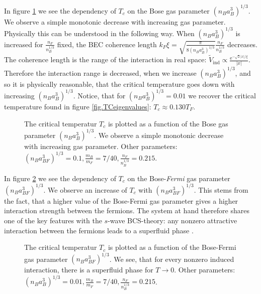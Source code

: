In figure \ref{fig.TCrB} we see the dependency of $T_c$ on the Bose gas parameter $(n_Ba_B^3)^{1/3}$. We observe a simple monotonic decrease with increasing gas parameter. Physically this can be understood in the following way. When $(n_Ba_B^3)^{1/3}$ is increased for $\frac{n_F}{n_B^{1/3}}$ fixed, the BEC coherence length $k_F\xi = \sqrt{ \frac{\pi}{ 8(n_Ba_B^3)^{1/3} } }\frac{ n_F }{ n_B^{1/3} }$ decreases. The coherence length is the range of the interaction in real space: $\tilde{V}_{\text{ind}} \propto \frac{ \text{e}^{ -\sqrt{2}|x|/\xi } } {|x|}$. Therefore the interaction range is decreased, when we increase $(n_Ba_B^3)^{1/3}$, and so it is physically reasonable, that the critical temperature goes down with increasing $(n_Ba_B^3)^{1/3}$. Notice, that for $(n_Ba_{B}^3)^{1/3} = 0.01$ we recover the critical temperature found in figure \ref{fig.TCeigenvalues}: $T_c \approx 0.130 T_F$. 

\begin{figure} 
\begin{center}  
  
\caption{The critical temperatur $T_c$ is plotted as a function of the Bose gas parameter $(n_Ba_B^3)^{1/3}$. We observe a simple monotonic decrease with increasing gas parameter. Other parameters: $(n_Ba_{BF}^3)^{1/3} = 0.1, \frac{m_B}{m_F} = 7/40, \frac{n_F}{n_B^{1/3}} = 0.215$. }  
\label{fig.TCrB}  
\end{center}    
\end{figure}

In figure \ref{fig.TCrBF} we see the dependency of $T_c$ on the Bose-\textit{Fermi} gas parameter $(n_Ba_{BF}^3)^{1/3}$. We observe an increase of $T_c$ with $(n_Ba_{BF}^3)^{1/3}$. This stems from the fact, that a higher value of the Bose-Fermi gas parameter gives a higher interaction strength between the fermions. The system at hand therefore shares one of the key features with the $s$-wave BCS-theory: any nonzero attractive interaction between the fermions leads to a superfluid phase \cite[pp. 156-157]{LandauStatPhys2}. 

\begin{figure} 
\begin{center}  
  
\caption{The critical temperatur $T_c$ is plotted as a function of the Bose-Fermi gas parameter $(n_Ba_{BF}^3)^{1/3}$. We see, that for every nonzero induced interaction, there is a superfluid phase for $T\to 0$. Other parameters: $(n_Ba_{B}^3)^{1/3} = 0.01, \frac{m_B}{m_F} = 7/40, \frac{n_F}{n_B^{1/3}} = 0.215$. }  
\label{fig.TCrBF}  
\end{center}    
\end{figure}



